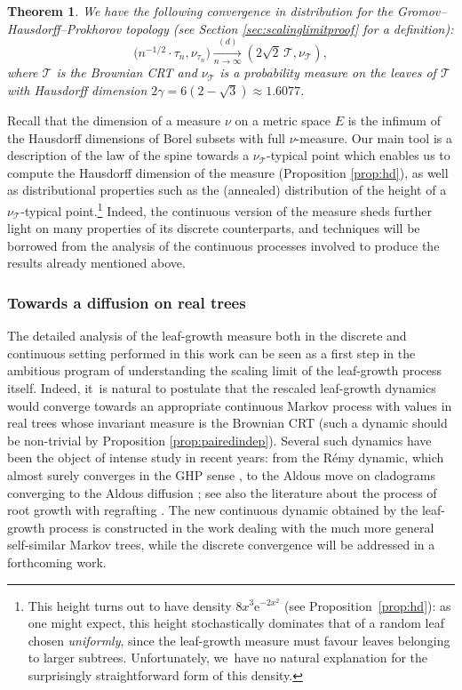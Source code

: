 \documentclass[11pt]{article}
\newcommand{\T}{\mathcal{T}}\let\CRT\T\let\tbr\T
\newtheorem{thm}{Theorem}[section]
\theoremstyle{definition}
\begin{document}
\begin{thm}\label{thm:ghpanddim} We have the following convergence in distribution for the Gromov--Hausdorff--Prokhorov topology (see Section \ref{sec:scalinglimitproof} for a definition):\vspace*{-3pt}
\[
\bigl(n^{-1/2} \cdot \tau_n, \nu_{\tau_n} \bigr) \xrightarrow[\textstyle n\to \infty]{\textstyle (d)}(2\sqrt{2}\,\mathcal{T}, \nu_{ \mathcal{T}}),
\]
where $ \mathcal{T}$ is the Brownian CRT and $\nu_{\mathcal{T}}$ is a probability measure on the leaves of $\T$ with Hausdorff dimension $2\gamma= 6(2- \sqrt{3}) \approx 1.6077$.
\end{thm}
Recall that the dimension of a measure $\nu$ on a metric space $E$ is the infimum of the Hausdorff dimensions of Borel subsets with full $\nu$-measure. Our main tool is a description of the law of the spine towards a $\nu_{\mathcal{T}}$-typical point which enables us to compute the Hausdorff dimension of the measure (Proposition \ref{prop:hd}), as well as distributional properties such as the (annealed) distribution of the height of a $\nu_{\mathcal{T}}$\nobreakdash-typical point.\footnote{This height turns out to have density $8x^3\mathrm{e}^{-2x^2}$ (see Proposition~\ref{prop:hd}): as one might expect, this height stochastically dominates that of a random leaf chosen \emph{uniformly}, since the leaf-growth measure must favour leaves belonging to larger subtrees. Unfortunately, we~have no natural explanation for the surprisingly straightforward form of this density.} Indeed, the continuous version of the measure sheds further light on many properties of its discrete counterparts, and techniques will be borrowed from the analysis of the continuous processes involved to produce the results already mentioned above.

\subsubsection*{Towards a diffusion on real trees} The detailed analysis of the leaf-growth measure both in the discrete and continuous setting performed in this work can be seen as a first step in the ambitious program of understanding the scaling limit of the leaf-growth process itself. Indeed, it~is natural to postulate that the rescaled leaf-growth dynamics would converge towards an appropriate continuous Markov process with values in real trees whose invariant measure is the Brownian CRT (such a dynamic should be non-trivial by Proposition \ref{prop:pairedindep}). Several such dynamics have been the \hbox{object} of intense study in recent years: from the Rémy dynamic, which almost surely converges in the GHP sense \cite{CurienHaas}, to the Aldous move on cladograms converging to the Aldous diffusion \cite{lohr2020aldous,FPRW18,FPRW20,forman2023aldous}; see also the literature about the process of root growth with regrafting \cite{MR2221786}. The new continuous dynamic obtained by the leaf-growth process is constructed in the work \cite{CFT25} dealing with the much more general self-similar Markov trees, while the discrete convergence will be addressed in a forthcoming work.
\end{document}
